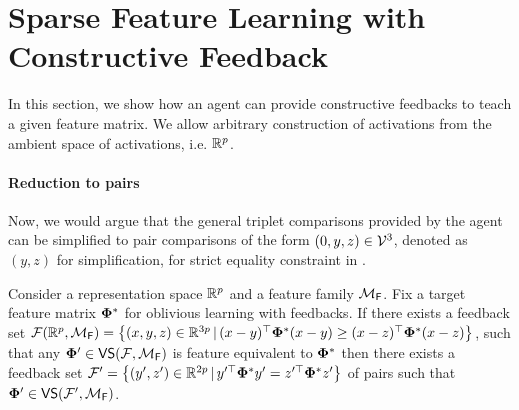 \section{Sparse Feature Learning with Constructive Feedback}

In this section, we show how an agent can provide constructive feedbacks to teach a given feature matrix. We allow arbitrary construction of activations from the ambient space of activations, i.e. $\mathbb{R}^p$.

\paragraph{Reduction to pairs}
Now, we would argue that the general triplet comparisons provided by the agent can be simplified to pair comparisons of the form $(0, y,z) \in {\mathcal{V}}^3$, denoted as $(y,z)$ for simplification, for strict equality constraint in .%


\begin{lemma}\label{lem: reduction}
    Consider a representation space $\mathbb{R}^p$ and a feature family ${\mathcal{M}}_{\mathsf{F}}$. Fix a target feature matrix $\boldsymbol{\Phi}^*$ for oblivious learning with feedbacks. If there exists a feedback set ${\mathcal{F}}(\mathbb{R}^p, {\mathcal{M}}_{\mathsf{F}}) = \left\{(x,y,z) \in \mathbb{R}^{3p}\,|\, (x-y)^{\top}\boldsymbol{\Phi}^*(x-y) \ge (x-z)^{\top}\boldsymbol{\Phi}^*(x-z)\right\} $, such that any $\boldsymbol{\Phi}' \in \textsf{VS}({\mathcal{F}}, {\mathcal{M}}_{\mathsf{F}})$ is feature equivalent to ${\boldsymbol{\Phi}^*}$ then there exists a feedback set ${\mathcal{F}}' = \left\{(y',z') \in \mathbb{R}^{2p}\,|\, y'^\top{\boldsymbol{\Phi}^*}y' = z'^\top{\boldsymbol{\Phi}^*}z'\right\}$ of pairs such that $\boldsymbol{\Phi}' \in \textsf{VS}({\mathcal{F}}',{\mathcal{M}}_{\mathsf{F}})$.
\end{lemma}

